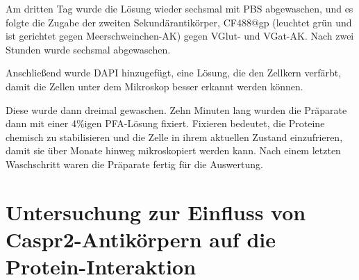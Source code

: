 Am dritten Tag wurde die Lösung wieder sechsmal mit PBS abgewaschen, und
es folgte die Zugabe der zweiten Sekundärantikörper, CF488@gp (leuchtet
grün und ist gerichtet gegen Meerschweinchen-AK) gegen VGlut- und
VGat-AK. Nach zwei Stunden wurde sechsmal abgewaschen.

Anschließend wurde DAPI hinzugefügt, eine Lösung, die den Zellkern
verfärbt, damit die Zellen unter dem Mikroskop besser erkannt werden
können.

Diese wurde dann dreimal gewaschen. Zehn Minuten lang wurden die
Präparate dann mit einer 4\%igen PFA-Lösung fixiert. Fixieren bedeutet,
die Proteine chemisch zu stabilisieren und die Zelle in ihrem aktuellen
Zustand \glqq einzufrieren\grqq{}, damit sie über Monate hinweg
mikroskopiert werden kann. Nach einem letzten Waschschritt waren die
Präparate fertig für die Auswertung.

\section{Untersuchung zur Einfluss von Caspr2-Antikörpern auf die
	Protein-Interaktion}